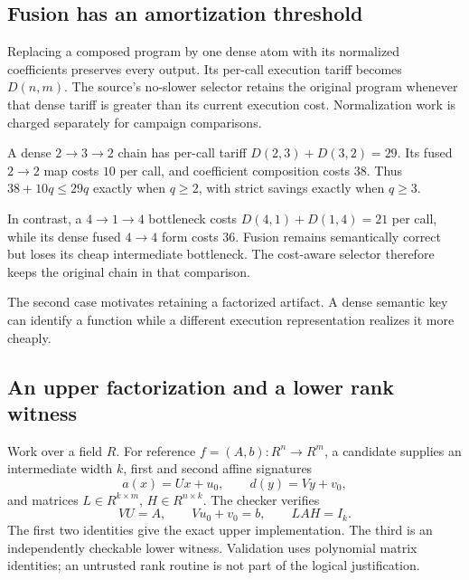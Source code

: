 \subsection{Fusion has an amortization threshold}

Replacing a composed program by one dense atom with its normalized coefficients preserves every output. Its per-call execution tariff becomes $D(n,m)$. The source's no-slower selector retains the original program whenever that dense tariff is greater than its current execution cost. Normalization work is charged separately for campaign comparisons.

\begin{example}
A dense $2\to3\to2$ chain has per-call tariff $D(2,3)+D(3,2)=29$. Its fused $2\to2$ map costs $10$ per call, and coefficient composition costs $38$. Thus $38+10q\le29q$ exactly when $q\ge2$, with strict savings exactly when $q\ge3$.

In contrast, a $4\to1\to4$ bottleneck costs $D(4,1)+D(1,4)=21$ per call, while its dense fused $4\to4$ form costs $36$. Fusion remains semantically correct but loses its cheap intermediate bottleneck. The cost-aware selector therefore keeps the original chain in that comparison.
\end{example}

The second case motivates retaining a factorized artifact. A dense semantic key can identify a function while a different execution representation realizes it more cheaply.

\subsection{An upper factorization and a lower rank witness}

Work over a field $R$. For reference $f=(A,b):R^n\to R^m$, a candidate supplies an intermediate width $k$, first and second affine signatures
\[
 a(x)=Ux+u_0,\qquad d(y)=Vy+v_0,
\]
and matrices $L\in R^{k\times m}$, $H\in R^{n\times k}$. The checker verifies
\[
 VU=A,\qquad Vu_0+v_0=b,\qquad LAH=I_k.
\]
The first two identities give the exact upper implementation. The third is an independently checkable lower witness. Validation uses polynomial matrix identities; an untrusted rank routine is not part of the logical justification.

